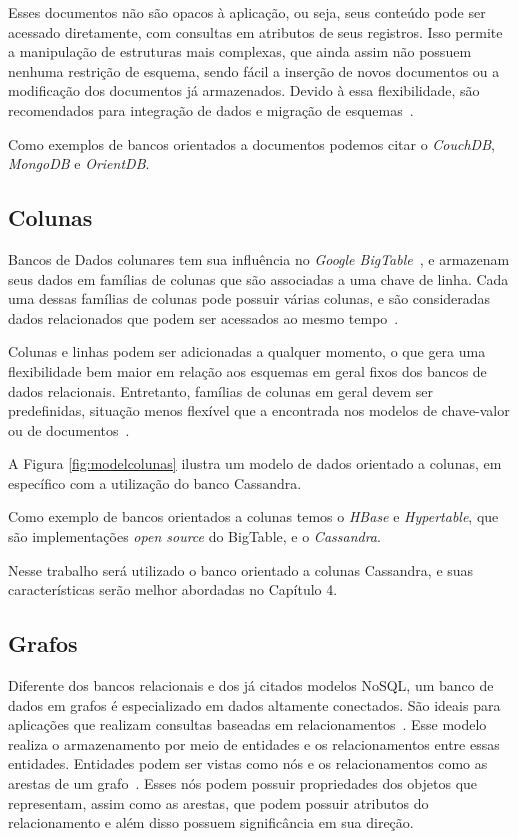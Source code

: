 
Esses documentos não são opacos à aplicação, ou seja, seus conteúdo pode ser acessado diretamente, com consultas em atributos de seus registros. Isso permite a manipulação de estruturas mais complexas, que ainda assim não possuem nenhuma restrição de esquema, sendo fácil a inserção de novos documentos ou a modificação dos documentos já armazenados. Devido à essa flexibilidade, são recomendados para integração de dados e migração de esquemas~\cite{nosqleval}. 

Como exemplos de bancos orientados a documentos podemos citar o \emph{CouchDB}, \emph{MongoDB} e \emph{OrientDB}.

\subsection*{Colunas}
Bancos de Dados colunares tem sua influência no \emph{Google BigTable}~\cite{bigtable}, e armazenam seus dados em famílias de colunas que são associadas a uma chave de linha. Cada uma dessas famílias de colunas pode possuir várias colunas, e são consideradas dados relacionados que podem ser acessados ao mesmo tempo~\cite{pramod}. 

Colunas e linhas podem ser adicionadas a qualquer momento, o que gera uma flexibilidade bem maior em relação aos esquemas em geral fixos dos bancos de dados relacionais.  Entretanto, famílias de colunas em geral devem ser predefinidas, situação menos flexível que a encontrada nos modelos de chave-valor ou de documentos~\cite{nosqleval}.  

A Figura \ref{fig:modelcolunas} ilustra um modelo de dados orientado a colunas, em específico com a utilização do banco Cassandra.

Como exemplo de bancos orientados a colunas temos o \emph{HBase} e \emph{Hypertable}, que são implementações \emph{open source} do BigTable, e o \emph{Cassandra}.

Nesse trabalho será utilizado o banco orientado a colunas Cassandra, e suas características serão melhor abordadas no Capítulo 4.


\subsection*{Grafos}
Diferente dos bancos relacionais e dos já citados modelos NoSQL, um banco de dados em grafos é especializado em dados altamente conectados. São ideais para aplicações que realizam consultas baseadas em relacionamentos~\cite{nosqleval}.
Esse modelo realiza o armazenamento por meio de entidades e os relacionamentos entre essas entidades. Entidades podem ser vistas como nós e os relacionamentos como as arestas de um grafo~\cite{pramod}. Esses nós podem possuir propriedades dos objetos que representam, assim como as arestas, que podem possuir atributos do relacionamento e além disso possuem significância em sua direção.

